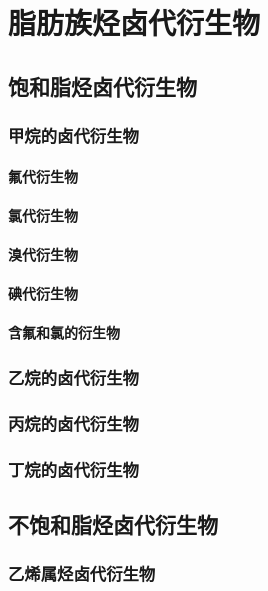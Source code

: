 \documentclass[UTF8]{../03-Chemistry}
\begin{document}
\section{脂肪族烃卤代衍生物}
    \subsection{饱和脂烃卤代衍生物}
        \subsubsection{甲烷的卤代衍生物}
            \paragraph{氟代衍生物}
            \paragraph{氯代衍生物}
            \paragraph{溴代衍生物}
            \paragraph{碘代衍生物}
            \paragraph{含氟和氯的衍生物}
        \subsubsection{乙烷的卤代衍生物}
        \subsubsection{丙烷的卤代衍生物}
        \subsubsection{丁烷的卤代衍生物}

    \subsection{不饱和脂烃卤代衍生物}
        \subsubsection{乙烯属烃卤代衍生物}
\end{document}
